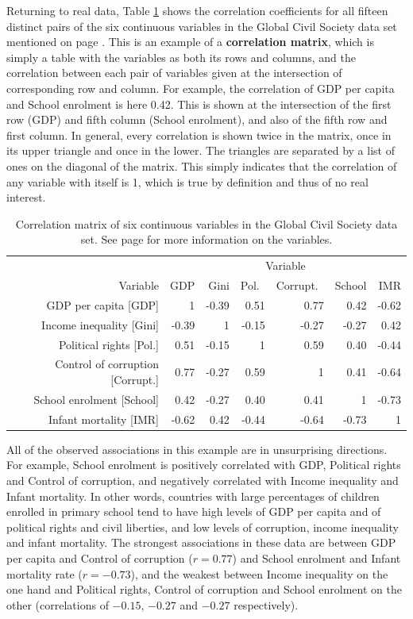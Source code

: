 Returning to real data, Table \ref{t_civilsoc_r} shows the correlation
coefficients for all fifteen distinct pairs of the six continuous
variables in the Global Civil Society data set mentioned on page
\pageref{p_civilsoc}. This is an example of a \textbf{correlation
matrix}, which is simply a table with the variables as both its rows and
columns, and the correlation between each pair of variables given at the
intersection of corresponding row and column. For example, the
correlation of GDP per capita and School enrolment is here 0.42. This is
shown at the intersection of the first row (GDP) and fifth column
(School enrolment), and also of the fifth row and first column. In
general, every correlation is shown twice in the matrix, once in its
upper triangle and once in the lower. The triangles are separated by a
list of ones on the diagonal of the matrix. This simply indicates that
the correlation of any variable with itself is 1, which is true by
definition and thus of no real interest.

\begin{table}
\caption{
Correlation matrix of six continuous variables in the Global Civil
Society data set. See page \pageref{p_civilsoc} for more information on the
variables.}
\label{t_civilsoc_r}
\begin{center}
\begin{tabular}{|r|rrrrrr|}\hline
& \multicolumn{6}{|c|}{Variable} \\
Variable & GDP & Gini & Pol.\ & Corrupt.\ & School & IMR \\ \hline
GDP per capita [GDP] & 1 & -0.39 & 0.51 & 0.77 & 0.42 & -0.62 \\
Income inequality [Gini] & -0.39 & 1& -0.15 & -0.27 & -0.27 & 0.42 \\
Political rights [Pol.] & 0.51 & -0.15 & 1& 0.59 & 0.40 & -0.44 \\
Control of corruption [Corrupt.]& 0.77 & -0.27 & 0.59 & 1& 0.41 & -0.64 \\
School enrolment [School] & 0.42 & -0.27 & 0.40 & 0.41 &1 & -0.73 \\
Infant mortality [IMR] & -0.62 & 0.42 & -0.44 & -0.64 & -0.73 & 1\\
\hline
\end{tabular}
\end{center}
\end{table}

All of the observed associations in this example are in unsurprising
directions. For example, School enrolment is positively correlated with
GDP, Political rights and Control of corruption, and negatively
correlated with Income inequality and Infant mortality. In other words,
countries with large percentages of children enrolled in primary school
tend to have high levels of GDP per capita and of political rights and
civil liberties,  and low levels of corruption, income inequality and
infant mortality. The strongest associations in these data are
between GDP per capita and Control of corruption ($r=0.77$) and School
enrolment and Infant mortality rate ($r=-0.73$), and the weakest between
Income inequality on the one hand and Political rights, Control of
corruption and School enrolment on the other (correlations of $-0.15$,
$-0.27$ and $-0.27$ respectively).

